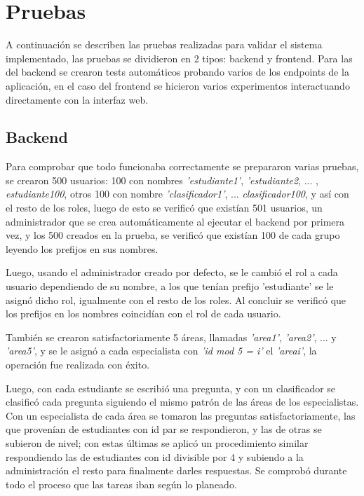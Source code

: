 \chapter{Pruebas}\label{chapter:testing}

A continuación se describen las pruebas realizadas para validar el sistema implementado, las pruebas se dividieron en 2 tipos: backend y frontend. Para las del backend se crearon tests automáticos probando varios de los endpoints de la aplicación, en el caso del frontend se hicieron varios experimentos interactuando directamente con la interfaz web.

\section{Backend}

Para comprobar que todo funcionaba correctamente se prepararon varias pruebas, se crearon 500 usuarios: 100 con nombres \textit{'estudiante1'}, \textit{'estudiante2}, ... , \textit{estudiante100}, otros 100 con nombre \textit{'clasificador1'}, ... \textit{clasificador100}, y así con el resto de los roles, luego de esto se verificó que existían 501 usuarios, un administrador que se crea automáticamente al ejecutar el backend por primera vez, y los 500 creados en la prueba, se verificó que existían 100 de cada grupo leyendo los prefijos en sus nombres.
\newline

Luego, usando el administrador creado por defecto, se le cambió el rol a cada usuario dependiendo de su nombre, a los que tenían prefijo 'estudiante' se le asignó dicho rol, igualmente con el resto de los roles. Al concluir se verificó que los prefijos en los nombres coincidían con el rol de cada usuario.
\newline

También se crearon satisfactoriamente 5 áreas, llamadas \textit{'area1'}, \textit{'area2'}, ... y \textit{'area5'}, y se le asignó a cada especialista con \textit{'id mod 5 = i'} el \textit{'areai'}, la operación fue realizada con éxito.
\newline

Luego, con cada estudiante se escribió una pregunta, y con un clasificador se clasificó cada pregunta siguiendo el mismo patrón de las áreas de los especialistas. Con un especialista de cada área se tomaron las preguntas satisfactoriamente, las que provenían de estudiantes con id par se respondieron, y las de otras se subieron de nivel; con estas últimas se aplicó un procedimiento similar respondiendo las de estudiantes con id divisible por 4 y subiendo a la administración el resto para finalmente darles respuestas. Se comprobó durante todo el proceso que las tareas iban según lo planeado.
\newline

